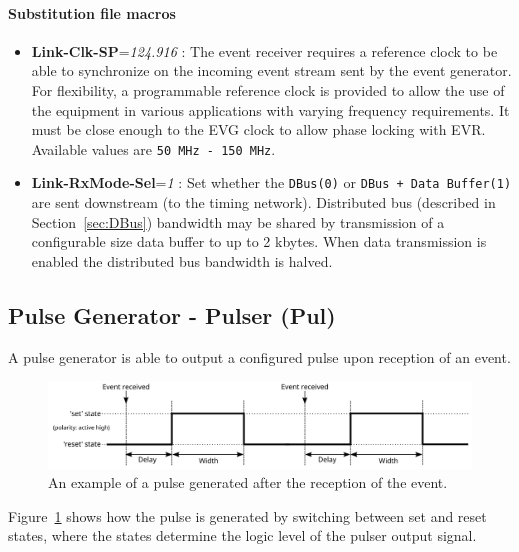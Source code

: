 \documentclass[12pt,a4paper]{article}
\begin{document}
\paragraph{Substitution file macros}
\begin{itemize}
\item
	\textbf{Link-Clk-SP}=\emph{124.916} : The event receiver requires a
reference clock to be able to synchronize on the incoming event
stream sent by the event generator. For flexibility, a programmable
reference clock is provided to allow the use of the equipment in
various applications with varying frequency requirements. It must be
close enough to the EVG clock to allow phase locking with
EVR. Available values are \texttt{50 MHz - 150 MHz}. 
\item
\textbf{Link-RxMode-Sel}=\emph{1} : Set whether the \texttt{DBus(0)} or
\texttt{DBus + Data Buffer(1)} are sent downstream (to the timing network). Distributed bus (described in Section~\ref{sec:DBus}) bandwidth may be shared by transmission of a configurable size data buffer to up to 2 kbytes. When data transmission is enabled the distributed bus bandwidth is halved. 
\end{itemize}


\subsection{Pulse Generator - Pulser (Pul)}\label{sec:Pulser}
A pulse generator is able to output a configured pulse upon reception of an event.
\begin{figure}[H]
	\centering
	\includegraphics[width=\columnwidth]{./img/pulserGeneric}
	\caption{An example of a pulse generated after the reception of the event.}
	\label{fig:pulser_generic}
\end{figure}
Figure~\ref{fig:pulser_generic} shows how the pulse is generated by switching between set and reset states, where the states determine the logic level of the pulser output signal.
\end{document}
